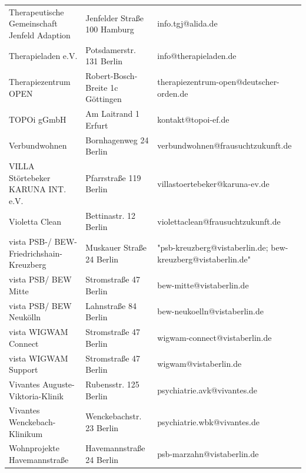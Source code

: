{\begin{xltabular}{\textwidth} {
 >{\raggedright\arraybackslash}p{5cm}
 >{\raggedright\arraybackslash}X
 >{\raggedright\arraybackslash}p{5cm} }
Therapeutische Gemeinschaft Jenfeld Adaption & Jenfelder Straße 100 Hamburg & info.tgj@alida.de \\
Therapieladen e.V. & Potsdamerstr. 131 Berlin & info@therapieladen.de \\
Therapiezentrum OPEN & Robert-Bosch-Breite 1c Göttingen & therapiezentrum-open@deutscher-orden.de \\
TOPOi gGmbH & Am Laitrand 1 Erfurt & kontakt@topoi-ef.de \\
Verbundwohnen & Bornhagenweg 24 Berlin & verbundwohnen@frausuchtzukunft.de \\
VILLA Störtebeker KARUNA INT. e.V. & Pfarrstraße 119 Berlin & villastoertebeker@karuna-ev.de \\
Violetta Clean & Bettinastr. 12 Berlin & violettaclean@frausuchtzukunft.de \\
vista PSB-/ BEW-Friedrichshain-Kreuzberg & Muskauer Straße 24 Berlin & "psb-kreuzberg@vistaberlin.de; bew-kreuzberg@vistaberlin.de" \\
vista PSB/ BEW Mitte & Stromstraße 47 Berlin & bew-mitte@vistaberlin.de \\
vista PSB/ BEW Neukölln & Lahnstraße 84 Berlin & bew-neukoelln@vistaberlin.de \\
vista WIGWAM Connect & Stromstraße 47 Berlin & wigwam-connect@vistaberlin.de \\
vista WIGWAM Support & Stromstraße 47 Berlin & wigwam@vistaberlin.de \\
Vivantes Auguste-Viktoria-Klinik & Rubensstr. 125 Berlin & psychiatrie.avk@vivantes.de \\
Vivantes Wenckebach-Klinikum & Wenckebachstr. 23 Berlin & psychiatrie.wbk@vivantes.de \\
Wohnprojekte Havemannstraße & Havemannstraße 24 Berlin & psb-marzahn@vistaberlin.de \\

\end{xltabular}}
